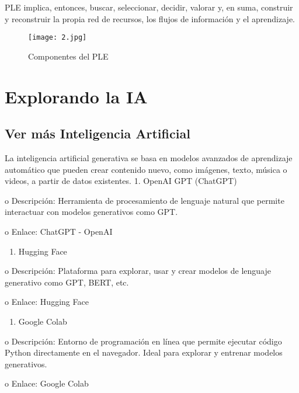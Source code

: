 \documentclass[a4paper12pt]{article}
\providecommand{\tightlist}{%
      \setlength{\itemsep}{0pt}\setlength{\parskip}{0pt}}
\begin{document}
    PLE implica, entonces, buscar, seleccionar, decidir, valorar y, en suma,
construir y reconstruir la propia red de recursos, los flujos de
información y el aprendizaje.

    \begin{figure}
\centering
\texttt{[image: 2.jpg]}
\caption{Componentes del PLE}
\end{figure}

    \hypertarget{explorando-la-ia}{%
\section{Explorando la IA}\label{explorando-la-ia}}

    \hypertarget{ver-muxe1s-inteligencia-artificial}{%
\subsection{Ver más Inteligencia
Artificial}\label{ver-muxe1s-inteligencia-artificial}}

La inteligencia artificial generativa se basa en modelos avanzados de
aprendizaje automático que pueden crear contenido nuevo, como imágenes,
texto, música o videos, a partir de datos existentes. 1. OpenAI GPT
(ChatGPT)

o Descripción: Herramienta de procesamiento de lenguaje natural que
permite interactuar con modelos generativos como GPT.

o Enlace: ChatGPT - OpenAI

\begin{enumerate}
\def\labelenumi{\arabic{enumi}.}
\setcounter{enumi}{1}
\tightlist
\item
  Hugging Face
\end{enumerate}

o Descripción: Plataforma para explorar, usar y crear modelos de
lenguaje generativo como GPT, BERT, etc.

o Enlace: Hugging Face

\begin{enumerate}
\def\labelenumi{\arabic{enumi}.}
\setcounter{enumi}{2}
\tightlist
\item
  Google Colab
\end{enumerate}

o Descripción: Entorno de programación en línea que permite ejecutar
código Python directamente en el navegador. Ideal para explorar y
entrenar modelos generativos.

o Enlace: Google Colab
\end{document}

